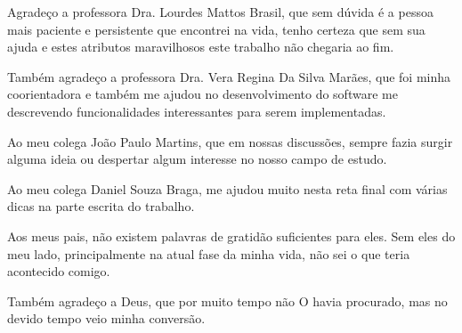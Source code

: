 \begin{agradecimentos}
	Agradeço a professora Dra. Lourdes Mattos Brasil, que sem dúvida é a pessoa mais paciente e persistente que encontrei na vida, tenho certeza que sem sua ajuda e estes atributos maravilhosos este trabalho não chegaria ao fim.

	Também agradeço a professora Dra. Vera Regina Da Silva Marães, que foi minha coorientadora e também me ajudou no desenvolvimento do software me descrevendo funcionalidades interessantes para serem implementadas.
	
	Ao meu colega João Paulo Martins, que em nossas discussões, sempre fazia surgir alguma ideia ou despertar algum interesse no nosso campo de estudo.
	
	Ao meu colega Daniel Souza Braga, me ajudou muito nesta reta final com várias dicas na parte escrita do trabalho.

	Aos meus pais, não existem palavras de gratidão suficientes para eles. Sem eles do meu lado, principalmente na atual fase da minha vida, não sei o que teria acontecido comigo.

	Também
	agradeço a Deus, que por muito tempo não O havia procurado, mas no devido tempo veio minha conversão.
	
\end{agradecimentos}
